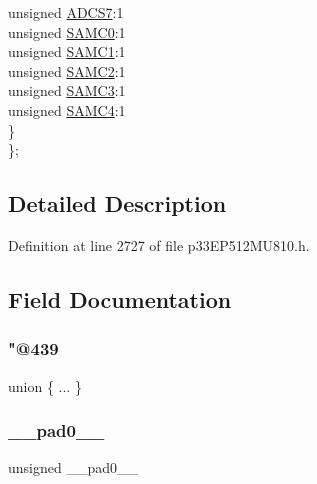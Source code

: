 \begin{DoxyCompactItemize}
\begin{tabbing}
\>\>unsigned \hyperlink{structtag_a_d2_c_o_n3_b_i_t_s_a8f0f24abf568326a16f0368565baf5c2}{ADCS7}:1\\
\>\>unsigned \hyperlink{structtag_a_d2_c_o_n3_b_i_t_s_a07d2c9b1a4fcb5fd2a7acc216e8aecab}{SAMC0}:1\\
\>\>unsigned \hyperlink{structtag_a_d2_c_o_n3_b_i_t_s_aff3b08f0520090b987ff1fa5e8d90f07}{SAMC1}:1\\
\>\>unsigned \hyperlink{structtag_a_d2_c_o_n3_b_i_t_s_a671fcd1368ca4d1e5ed73025de208220}{SAMC2}:1\\
\>\>unsigned \hyperlink{structtag_a_d2_c_o_n3_b_i_t_s_a15086a4b474d7cfc569c16b62b95a82d}{SAMC3}:1\\
\>\>unsigned \hyperlink{structtag_a_d2_c_o_n3_b_i_t_s_a3bc46ad0a1f495c6419955fb68aafe49}{SAMC4}:1\\
\>\} \\
\}; \\

\end{tabbing}\end{DoxyCompactItemize}


\subsection{Detailed Description}


Definition at line 2727 of file p33\+E\+P512\+M\+U810.\+h.



\subsection{Field Documentation}
\mbox{\label{structtag_a_d2_c_o_n3_b_i_t_s_a92c8196fb75bdcab1647d08c684c42cd}} 
\subsubsection{\texorpdfstring{"@439}{@439}}
{\footnotesize\ttfamily union \{ ... \} }

\mbox{\label{structtag_a_d2_c_o_n3_b_i_t_s_adf71f3d8410c1f1dbbc96680a92c49af}} 
\subsubsection{\texorpdfstring{\+\_\+\+\_\+pad0\+\_\+\+\_\+}{\_\_pad0\_\_}}
{\footnotesize\ttfamily unsigned \+\_\+\+\_\+pad0\+\_\+\+\_\+}



